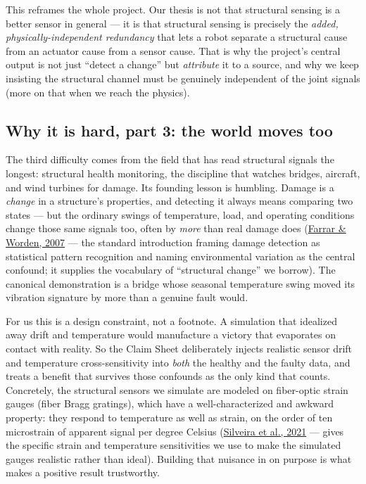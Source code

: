 \documentclass[12pt]{article}
\begin{document}
This reframes the whole project. Our thesis is not that structural sensing is a better sensor in general --- it is that structural sensing is precisely the \emph{added, physically-independent redundancy} that lets a robot separate a structural cause from an actuator cause from a sensor cause. That is why the project's central output is not just ``detect a change'' but \emph{attribute} it to a source, and why we keep insisting the structural channel must be genuinely independent of the joint signals (more on that when we reach the physics).

\subsection{Why it is hard, part 3: the world moves too}

The third difficulty comes from the field that has read structural signals the longest: structural health monitoring, the discipline that watches bridges, aircraft, and wind turbines for damage. Its founding lesson is humbling. Damage is a \emph{change} in a structure's properties, and detecting it always means comparing two states --- but the ordinary swings of temperature, load, and operating conditions change those same signals too, often by \emph{more} than real damage does (\href{https://doi.org/10.1098/rsta.2006.1928}{Farrar \& Worden, 2007} --- the standard introduction framing damage detection as statistical pattern recognition and naming environmental variation as the central confound; it supplies the vocabulary of ``structural change'' we borrow). The canonical demonstration is a bridge whose seasonal temperature swing moved its vibration signature by more than a genuine fault would.

For us this is a design constraint, not a footnote. A simulation that idealized away drift and temperature would manufacture a victory that evaporates on contact with reality. So the Claim Sheet deliberately injects realistic sensor drift and temperature cross-sensitivity into \emph{both} the healthy and the faulty data, and treats a benefit that survives those confounds as the only kind that counts. Concretely, the structural sensors we simulate are modeled on fiber-optic strain gauges (fiber Bragg gratings), which have a well-characterized and awkward property: they respond to temperature as well as strain, on the order of ten microstrain of apparent signal per degree Celsius (\href{https://doi.org/10.3390/s21175828}{Silveira et al., 2021} --- gives the specific strain and temperature sensitivities we use to make the simulated gauges realistic rather than ideal). Building that nuisance in on purpose is what makes a positive result trustworthy.
\end{document}

